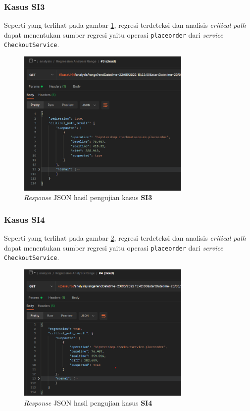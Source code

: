 \subsubsection{Kasus SI3}
Seperti yang terlihat pada gambar \ref{result_json_3}, regresi terdeteksi dan analisis \textit{critical path} dapat menentukan sumber regresi yaitu operasi \texttt{placeorder} dari \textit{service} \texttt{CheckoutService}.
\begin{figure}[!htb]
	\centering
	\includegraphics[width=0.75\textwidth]{resources/ch4/json/3.png}
	\caption{\textit{Response} JSON hasil pengujian kasus \textbf{SI3}}
	\label{result_json_3}
\end{figure}

\subsubsection{Kasus SI4}
Seperti yang terlihat pada gambar \ref{result_json_4}, regresi terdeteksi dan analisis \textit{critical path} dapat menentukan sumber regresi yaitu operasi \texttt{placeorder} dari \textit{service} \texttt{CheckoutService}.
\begin{figure}[!htb]
	\centering
	\includegraphics[width=0.75\textwidth]{resources/ch4/json/4.png}
	\caption{\textit{Response} JSON hasil pengujian kasus \textbf{SI4}}
	\label{result_json_4}
\end{figure}

